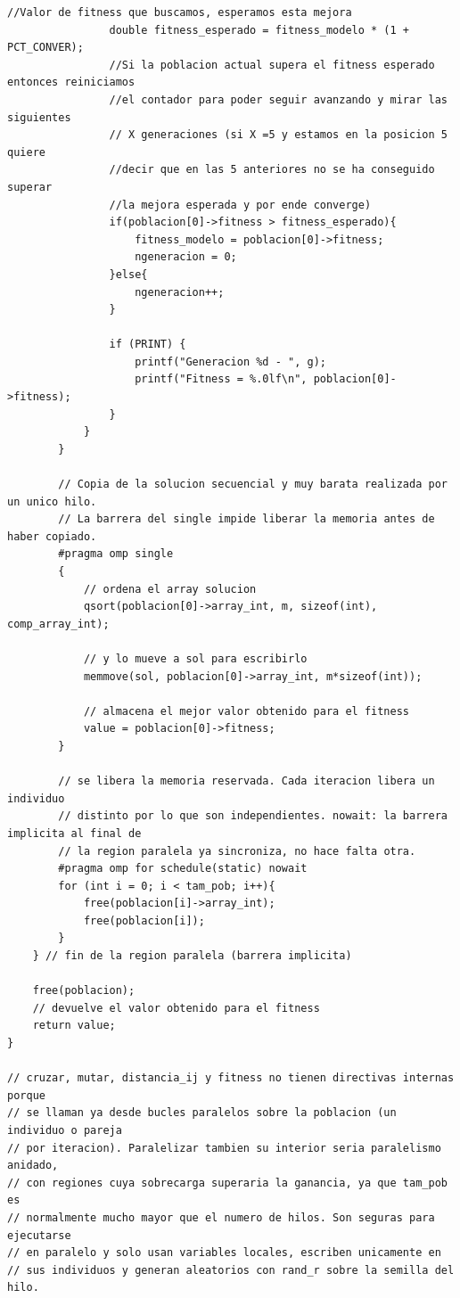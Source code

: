 \documentclass[12pt]{article}
\begin{document}
\begin{lstlisting}[style=EstiloC]
                //Valor de fitness que buscamos, esperamos esta mejora
                double fitness_esperado = fitness_modelo * (1 + PCT_CONVER);
                //Si la poblacion actual supera el fitness esperado entonces reiniciamos
                //el contador para poder seguir avanzando y mirar las siguientes
                // X generaciones (si X =5 y estamos en la posicion 5 quiere
                //decir que en las 5 anteriores no se ha conseguido superar
                //la mejora esperada y por ende converge)
                if(poblacion[0]->fitness > fitness_esperado){
                    fitness_modelo = poblacion[0]->fitness;
                    ngeneracion = 0;
                }else{
                    ngeneracion++;
                }

                if (PRINT) {
                    printf("Generacion %d - ", g);
                    printf("Fitness = %.0lf\n", poblacion[0]->fitness);
                }
            }
        }

        // Copia de la solucion secuencial y muy barata realizada por un unico hilo.
        // La barrera del single impide liberar la memoria antes de haber copiado.
        #pragma omp single
        {
            // ordena el array solucion
            qsort(poblacion[0]->array_int, m, sizeof(int), comp_array_int);

            // y lo mueve a sol para escribirlo
            memmove(sol, poblacion[0]->array_int, m*sizeof(int));

            // almacena el mejor valor obtenido para el fitness
            value = poblacion[0]->fitness;
        }

        // se libera la memoria reservada. Cada iteracion libera un individuo
        // distinto por lo que son independientes. nowait: la barrera implicita al final de
        // la region paralela ya sincroniza, no hace falta otra.
        #pragma omp for schedule(static) nowait
        for (int i = 0; i < tam_pob; i++){
            free(poblacion[i]->array_int);
            free(poblacion[i]);
        }
    } // fin de la region paralela (barrera implicita)

    free(poblacion);
    // devuelve el valor obtenido para el fitness
    return value;
}

// cruzar, mutar, distancia_ij y fitness no tienen directivas internas porque 
// se llaman ya desde bucles paralelos sobre la poblacion (un individuo o pareja
// por iteracion). Paralelizar tambien su interior seria paralelismo anidado,
// con regiones cuya sobrecarga superaria la ganancia, ya que tam_pob es
// normalmente mucho mayor que el numero de hilos. Son seguras para ejecutarse
// en paralelo y solo usan variables locales, escriben unicamente en
// sus individuos y generan aleatorios con rand_r sobre la semilla del hilo.


\end{lstlisting}
\end{document}
